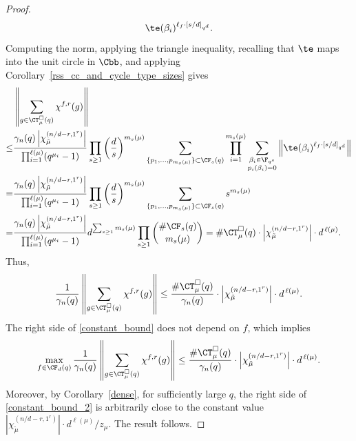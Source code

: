 \begin{proof}
\begin{equation}
\te(\beta_i)^{\ell_f \cdot [s/d]_{q^d}}.
\end{equation}
Computing the norm, applying the triangle inequality, recalling that \(\te\) maps into the unit circle in \(\Cbb\), and applying Corollary~\ref{rss_cc_and_cycle_type_sizes} gives
\begin{align*}
& \left \|
\sum_{g \in \CT^\Box_\mu (q)} \chi^{f,r} (g)
\right \| \\
\leq &
\frac{\gamma_n(q) \left | \chi^{(n/d-r,1^r)}_{\tilde{\mu}} \right |}{\prod_{i=1}^{\ell(\mu)} (q^{\mu_i}-1)}
\prod_{s \geq 1}
\left (
\frac{d}{s}
\right )^{m_s(\mu)}
\sum_{ \{p_1,\ldots,p_{m_s(\mu)}\} \subset \CF_s (q) }
\prod_{i=1}^{m_s(\mu)}
\sum_{\substack{\beta_i \in \F_{q^s} \\ p_i(\beta_i)=0}}
\left \|
\te(\beta_i)^{\ell_f \cdot [s/d]_{q^d}}
\right \| \\
= &
\frac{\gamma_n(q) \left | \chi^{(n/d-r,1^r)}_{\tilde{\mu}} \right |}{\prod_{i=1}^{\ell(\mu)} (q^{\mu_i}-1)}
\prod_{s \geq 1}
\left (
\frac{d}{s}
\right )^{m_s(\mu)}
\sum_{ \{p_1,\ldots,p_{m_s(\mu)}\} \subset \CF_s (q) }
s^{m_s(\mu)} \\
= &
\frac{\gamma_n(q) \left |\chi^{(n/d-r,1^r)}_{\tilde{\mu}} \right |}{\prod_{i=1}^{\ell(\mu)} (q^{\mu_i}-1)}
d^{\sum_{s \geq 1} m_s(\mu)}
\prod_{s \geq 1}
\binom{\# \CF_s (q)}{m_s(\mu)} = \# \CT_\mu^\Box (q) \cdot \left | \chi^{(n/d-r,1^r)}_{\tilde{\mu}} \right | \cdot d^{\, \ell(\mu)}.
\end{align*}
Thus,
\begin{equation}
\label{constant_bound}
\frac{1}{\gamma_n(q)}
\left \|
\sum_{g \in \CT_\mu^\Box (q)} \chi^{f,r} (g)
\right \|
\leq
\frac{\# \CT_\mu^\Box (q)}{
\gamma_n (q)}
\cdot \left | \chi^{(n/d-r,1^r)}_{\tilde{\mu}} \right | \cdot d^{\, \ell(\mu)}.
\end{equation}
The right side of \eqref{constant_bound} does not depend on \(f\), which implies
\begin{equation}
\label{constant_bound_2}
\max_{f \in \CF_d (q)}
\frac{1}{\gamma_n(q)}
\left \|
\sum_{g \in \CT_\mu^\Box (q)} \chi^{f,r} (g)
\right \|
\leq
\frac{\# \CT_\mu^\Box (q)}{
\gamma_n (q)}
\cdot \left | \chi^{(n/d-r,1^r)}_{\tilde{\mu}} \right | \cdot d^{\, \ell(\mu)}.
\end{equation}
Moreover, by Corollary~\ref{dense}, for sufficiently large \(q\), the right side of \eqref{constant_bound_2} is arbitrarily close to the constant value \(|\chi_{\tilde{\mu}}^{(n/d-r,1^r)}| \cdot d^{\ell(\mu)} / z_\mu\).
The result follows.
\end{proof}















